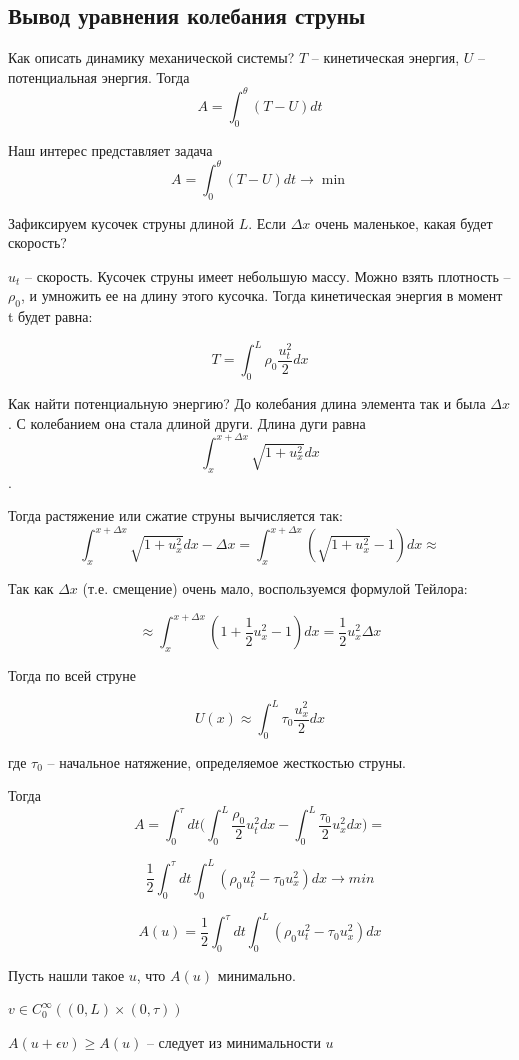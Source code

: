 \documentclass[12pt]{report}
\begin{document}
\subsection{Вывод уравнения колебания струны}

Как описать динамику механической системы? $T$ -- кинетическая энергия, $U$ -- потенциальная энергия. Тогда
$$A = \int^{\theta}_{0}{(T-U)dt}$$

Наш интерес представляет задача $$A = \int^{\theta}_{0}{(T-U)dt} \longrightarrow \min$$

Зафиксируем кусочек струны длиной $L$. Если $\Delta x$ очень маленькое, какая будет скорость? 

$u_t$ -- скорость. Кусочек струны имеет небольшую массу. Можно взять плотность -- $\rho_0$, и умножить ее на длину этого кусочка. Тогда кинетическая энергия в момент t будет равна: 

$$T = \int^{L}_{0}{\rho_0 \frac{u_t^2}{2}dx}$$

Как найти потенциальную энергию? До колебания длина элемента так и была $\Delta x$. С колебанием она стала длиной други. Длина дуги равна $$\int_{x}^{x + \Delta x}{\sqrt{1 + u_x^2}dx}$$.

Тогда растяжение или сжатие струны вычисляется так: 
$$\int_{x}^{x + \Delta x}{\sqrt{1 + u_x^2}dx} - \Delta x = \int_{x}^{x + \Delta x}{(\sqrt{1 + u_x^2} - 1)dx} \approx $$

Так как $\Delta x$ (т.е. смещение) очень мало, воспользуемся формулой Тейлора:

$$ \approx \int_{x}^{x + \Delta x}{(1 + \frac{1}{2}u_x^2 - 1)dx} = \frac{1}{2}u_x^2 \Delta x$$

Тогда по всей струне

$$U(x) \approx \int_{0}^{L}{\tau_0 \frac{u_x^2}{2}dx}$$

где $\tau_0$ -- начальное натяжение, определяемое жесткостью струны. 

Тогда
$$A = \int_{0}^{\tau}{dt} \bigl ( \int_{0}^{L}{\frac{\rho_0}{2}u_t^2dx} - \int_{0}^{L}{\frac{\tau_0}{2}u_x^2dx} \bigr ) = $$

$$ \frac{1}{2} \int^{\tau}_{0}{dt \int^{L}_{0}{(\rho_0 u_t^2 - \tau_0 u_x^2)dx}} \longrightarrow min$$

$$A(u) = \frac{1}{2} \int^{\tau}_{0}{dt \int^{L}_{0}{(\rho_0 u_t^2 - \tau_0 u_x^2)dx}}$$

Пусть нашли такое $u$, что $A(u)$ минимально. 

$v \in C_0^\infty((0, L) \times (0, \tau))$

$A(u + \epsilon v) \ge A(u)$ -- следует из минимальности $u$
\end{document}
